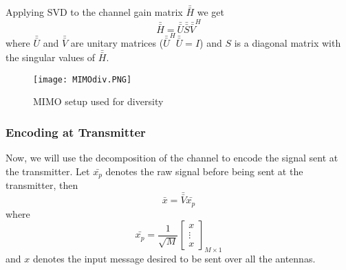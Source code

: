 Applying SVD to the channel gain matrix $\bar{\bar{H}}$ we get
\begin{equation}
    \label{eq:SVD H}
    \bar{\bar{H}} = \bar{\bar{U}} \bar{\bar{S}} \bar{\bar{V}}^H
\end{equation}
where $\bar{\bar{U}}$ and $\bar{\bar{V}}$ are unitary matrices ($\bar{\bar{U}}^H\bar{\bar{U}} = I$) and $S$ is a diagonal matrix with the singular values of $\bar{\bar{H}}$.
\begin{figure}[ht]
    \centering
    \texttt{[image: MIMOdiv.PNG]}
    \caption{MIMO setup used for diversity}
    \label{fig:MIMOdiv}
\end{figure}

\subsubsection{Encoding at Transmitter}
Now, we will use the decomposition of the channel to encode the signal sent at the transmitter. Let $\bar{x_p}$ denotes the raw signal before being sent at the transmitter, then 
\begin{equation}
    \label{eq:pre-coded x}
    \bar{x} = \bar{\bar{V}} \bar{x_p}
\end{equation}
where
\[ \bar{x_p} = \frac{1}{\sqrt{M}} \left[ \begin{array}{c}
    x \\
    \vdots \\
    x
\end{array} \right]_{M \times 1} \]
and $x$ denotes the input message desired to be sent over all the antennas.

